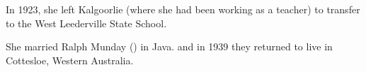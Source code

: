 
In 1923, she left Kalgoorlie (where she had been working as a teacher) to transfer to the West Leederville State School.\cite{VMkal}

She married Ralph Munday () in Java.\cite{LadiesSection} and in 1939 they returned to live in Cottesloe, Western Australia. 
